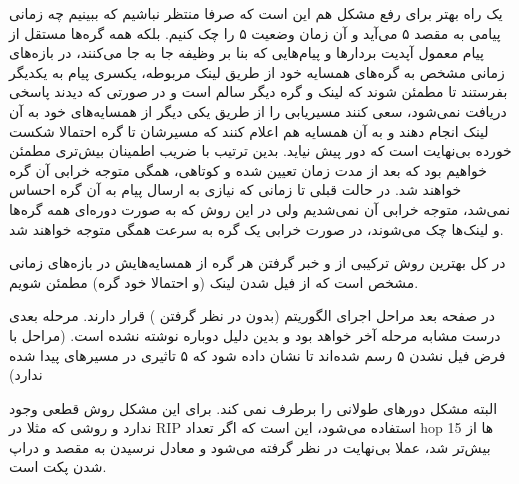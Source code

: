 \documentclass[12pt]{article}
\begin{document}
یک راه بهتر برای رفع مشکل هم این است که صرفا منتظر نباشیم که ببینیم چه زمانی پیامی به مقصد ۵ می‌آید و آن زمان وضعیت ۵ را چک کنیم. بلکه همه گره‌ها مستقل از پیام معمول آپدیت بردارها و پیام‌هایی که بنا بر وظیفه جا به جا می‌کنند، در بازه‌های زمانی مشخص به گره‌های همسایه خود از طریق لینک مربوطه، یکسری پیام  به یکدیگر بفرستند تا مطمئن شوند که لینک و گره دیگر سالم است و در صورتی که دیدند پاسخی دریافت نمی‌شود، سعی‌ کنند مسیریابی را از طریق یکی دیگر از همسایه‌های خود به آن لینک انجام دهند و به آن همسایه‌ هم اعلام کنند که مسیرشان تا گره احتمالا شکست خورده بی‌نهایت است که دور پیش نیاید. بدین ترتیب با ضریب اطمینان بیش‌تری مطمئن خواهیم بود که بعد از مدت زمان تعیین شده و کوتاهی، همگی متوجه خرابی آن گره خواهند شد. در حالت قبلی تا زمانی که نیازی به ارسال پیام به آن گره احساس نمی‌شد، متوجه خرابی آن نمی‌شدیم ولی در این روش که به صورت دوره‌ای همه گره‌ها و لینک‌ها چک می‌شوند، در صورت خرابی یک گره به سرعت همگی متوجه خواهند شد.

 
 در کل بهترین روش ترکیبی از  و خبر گرفتن هر گره از همسایه‌هایش در بازه‌های زمانی مشخص است که از فیل شدن لینک (و احتمالا خود گره) مطمئن شویم.
 
 
 در صفحه بعد مراحل اجرای الگوریتم (بدون در نظر گرفتن ) قرار دارند. مرحله بعدی درست مشابه مرحله آخر خواهد بود و بدین دلیل دوباره نوشته نشده است. (مراحل با فرض فیل نشدن ۵ رسم شده‌اند تا نشان داده شود که ۵ تاثیری در مسیرهای پیدا شده ندارد) 

البته  مشکل دورهای طولانی را برطرف نمی کند. برای این مشکل روش قطعی وجود ندارد و روشی که مثلا در RIP استفاده می‌شود، این است که اگر تعداد hop ها از 15 بیش‌تر شد، عملا بی‌نهایت در نظر گرفته می‌شود و معادل نرسیدن به مقصد و دراپ شدن پکت است.
 
\end{document}
